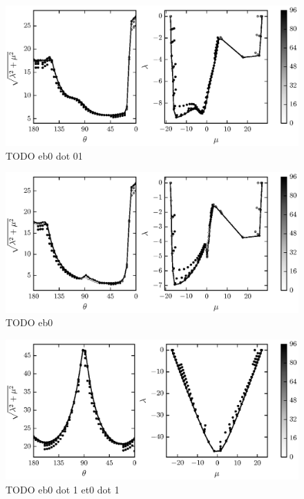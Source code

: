 	\begin{figure}
		\begin{center}
			\includegraphics{./fig/ch3/pull/eb0.01/grid.eps}
		\end{center}		
		\caption{ TODO eb0 dot 01
		\label{fig:PullGrid:eb0.01}}
	\end{figure}
	
	\begin{figure}
		\begin{center}
			\includegraphics{./fig/ch3/pull/eb0/grid.eps}
		\end{center}		
		\caption{ TODO eb0
		\label{fig:PullGrid:eb0}}
	\end{figure}
	
	\begin{figure}
		\begin{center}
			\includegraphics{./fig/ch3/pull/eb0.1_et0.1/grid.eps}
		\end{center}		
		\caption{ TODO eb0 dot 1 et0 dot 1
		\label{fig:PullGrid:eb0.1_et0.1}}
	\end{figure}
	
